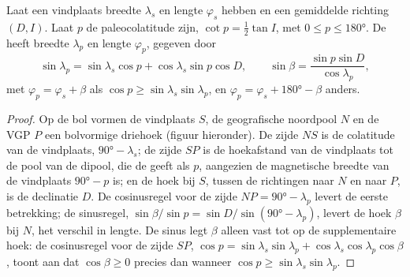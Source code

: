 \begin{theorem}\label{thm:b3:palaeomagnetism:pole}
Laat een vindplaats breedte $\lambda_s$ en lengte $\varphi_s$ hebben en een gemiddelde
richting $(D, I)$. Laat $p$ de paleocolatitude zijn, $\cot p = \tfrac12\tan I$,
met $0 \le p \le \ang{180}$. De  heeft breedte $\lambda_p$
en lengte $\varphi_p$, gegeven door
\[
  \sin\lambda_p = \sin\lambda_s\cos p + \cos\lambda_s\sin p\cos D,\qquad
  \sin\beta = \frac{\sin p\sin D}{\cos\lambda_p},
\]
met $\varphi_p = \varphi_s + \beta$ als $\cos p \ge \sin\lambda_s\sin\lambda_p$,
en $\varphi_p = \varphi_s + \ang{180} - \beta$ anders.
\end{theorem}

\begin{proof}
Op de bol vormen de vindplaats $S$, de geografische noordpool $N$ en de VGP $P$ een
bolvormige driehoek (figuur hieronder). De zijde $NS$ is de colatitude van de vindplaats,
$\ang{90} - \lambda_s$; de zijde $SP$ is de hoekafstand van de vindplaats tot
de pool van de dipool, die de  geeft als $p$, aangezien de magnetische breedte van de vindplaats
$\ang{90} - p$ is; en de hoek bij $S$, tussen de
richtingen naar $N$ en naar $P$, is de declinatie $D$. De cosinusregel voor de
zijde $NP = \ang{90} - \lambda_p$ levert de eerste betrekking; de sinusregel,
$\sin\beta/\sin p = \sin D/\sin(\ang{90} - \lambda_p)$, levert de hoek $\beta$
bij $N$, het verschil in lengte. De sinus legt $\beta$ alleen vast tot op de
supplementaire hoek: de cosinusregel voor de zijde $SP$, $\cos p = \sin\lambda_s
\sin\lambda_p + \cos\lambda_s\cos\lambda_p\cos\beta$, toont aan dat $\cos\beta \ge
0$ precies dan wanneer $\cos p \ge \sin\lambda_s\sin\lambda_p$.
\end{proof}

